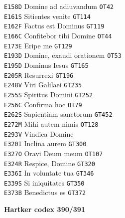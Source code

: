 \documentclass[a4paper]{article}
\begin{document}
{\begin{multicols}{2}
\texttt{E158D} Domine ad adiuvandum \texttt{OT42}\\
\texttt{E161S} Sitientes venite \texttt{GT114}\\
\texttt{E162F} Factus est Dominus \texttt{GT119}\\
\texttt{E166C} Confitebor tibi Domine \texttt{OT44}\\
\texttt{E173E} Eripe me \texttt{GT129}\\
\texttt{E193D} Domine, exaudi orationem \texttt{OT53}\\
\texttt{E195D} Dominus Iesus \texttt{GT165}\\
\texttt{E205R} Resurrexi \texttt{GT196}\\
\texttt{E248V} Viri Galilaei \texttt{GT235}\\
\texttt{E255S} Spiritus Domini \texttt{GT252}\\
\texttt{E256C} Confirma hoc \texttt{OT79}\\
\texttt{E262S} Sapientiam sanctorum \texttt{GT452}\\
\texttt{E272M} Mihi autem nimis \texttt{OT128}\\
\texttt{E293V} Vindica Domine\\
\texttt{E320I} Inclina aurem \texttt{GT300}\\
\texttt{E327O} Oravi Deum meum \texttt{OT107}\\
\texttt{E324R} Respice, Domine \texttt{GT320}\\
\texttt{E336I} In voluntate tua \texttt{GT346}\\
\texttt{E339S} Si iniquitates \texttt{GT350}\\
\texttt{E373B} Benedictus es \texttt{GT372}

\noindent\textbf{Hartker codex 390/391}


\end{multicols}}
\end{document}
